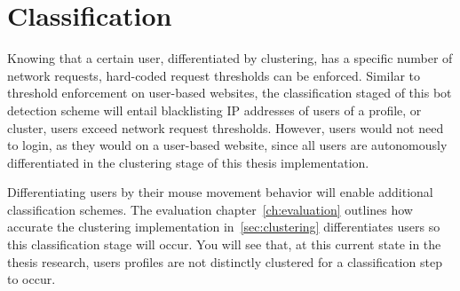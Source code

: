 
\section{Classification}\label{sec:classification}
Knowing that a certain user, differentiated by clustering, has a specific number of network requests, hard-coded request thresholds can be enforced.
Similar to threshold enforcement on user-based websites, the classification staged of this bot detection scheme will entail blacklisting IP addresses of users of a profile, or cluster, users exceed network request thresholds.
However, users would not need to login, as they would on a user-based website, since all users are autonomously differentiated in the clustering stage of this thesis implementation.

Differentiating users by their mouse movement behavior will enable additional classification schemes.
The evaluation chapter~\ref{ch:evaluation} outlines how accurate the clustering implementation in~\ref{sec:clustering} differentiates users so this classification stage will occur.
You will see that, at this current state in the thesis research, users profiles are not distinctly clustered for a classification step to occur.
